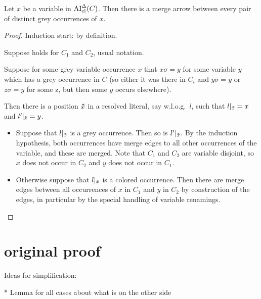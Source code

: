 \documentclass[,%
	paper=a4,%
	DIV11, %
	twoside=false,%
	liststotoc,
	bibtotoc,
	draft=false,%
	numbers=noendperiod
]{scrartcl}
\begin{document}
\begin{lemma}
	\label{lemma:arrow_from_grey_to_grey}
	Let $x$ be a variable in $\operatorname{AI}_\mathrm{cl}^\Delta(C)$.
	Then there is a merge arrow between every pair of distinct grey occurrences of $x$. 
\end{lemma}
\begin{proof}
	Induction start: by definition.

	Suppose holds for $C_1$ and $C_2$, usual notation.

	Suppose for some grey variable occurrence $x$ that $x\sigma = y$ for some variable $y$ which has a grey occurrence in $C$ (so either it was there in $C_i$ and $y\sigma = y$ or $z\sigma = y$ for some z,  but then some $y$ occurs elsewhere). 

	Then there is a position $\bm\hat x$ in a resolved literal, say w.l.o.g.\ $l$, such that $l|_{\bm\hat x} = x$ and $l'|_{\bm\hat x} = y$.

	\begin{itemize}
		\item
			Suppose that $l|_{\bm\hat x}$ is a grey occurrence.
			Then so is $l'|_{\bm\hat x}$.
			By the induction hypothesis, both occurrences have merge edges to all other occurrences of the variable, and these are merged.
			Note that $C_1$ and $C_2$ are variable disjoint, so $x$ does not occur in $C_2$ and $y$ does not occur in $C_1$.

		\item
			Otherwise suppose that $l|_{\bm\hat x}$ is a colored occurrence.
			Then there are merge edges between all occurrences of $x$ in $C_1$ and $y$ in $C_2$ by construction of the edges, in particular by the special handling of variable renamings.
			\qedhere
	\end{itemize}

\end{proof}

\section{original proof}

Ideas for simplification:

* Lemma for all cases about what is on the other side
\end{document}
